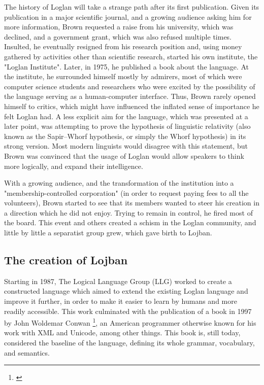 The history of Loglan will take a strange path after its first publication. Given its publication in a major scientific journal, and a growing audience
asking him for more information, Brown requested a raise from his university, which was declined, and a government grant, which was also refused multiple times.
Insulted, he eventually resigned from his research position and, using money gathered by activities other than scientific research, started his own institute,
the "Loglan Institute". Later, in 1975, he published a book about the language. At the institute, he surrounded himself mostly by admirers, most of which were computer science
students and researchers who were excited by the possibility of the language serving as a human-computer interface. Thus, Brown rarely opened himself to critics,
which might have influenced the inflated sense of importance he felt Loglan had. A less explicit aim for the language, which was presented at a later point, was attempting
to prove the hypothesis of linguistic relativity (also known as the Sapir–Whorf hypothesis, or simply the Whorf hypothesis) in its strong version.
Most modern linguists would disagree with this statement, but Brown was convinced that the usage of Loglan would allow speakers to think more logically, and expand their
intelligence.\newline

With a growing audience, and the transformation of the institution into a "membership-controlled corporation" (in order to request paying fees to all the volunteers),
Brown started to see that its members wanted to steer his creation in a direction which he did not enjoy. Trying to remain in control, he fired most of the board.
This event and others created a schism in the Loglan community, and little by little a separatist group grew, which gave birth to Lojban.

\subsection{The creation of Lojban}

Starting in 1987, The Logical Language Group (LLG) worked to create a constructed language which aimed to extend the existing Loglan language and improve it further,
in order to make it easier to learn by humans and more readily accessible. This work culminated with the publication of a book in 1997 by
John Woldemar Conwan \footnote{\cite{cowan1997complete}}, an American programmer otherwise known for his work with XML and Unicode, among other things. This book is,
still today, considered the baseline of the language, defining its whole grammar, vocabulary, and semantics.\newline

